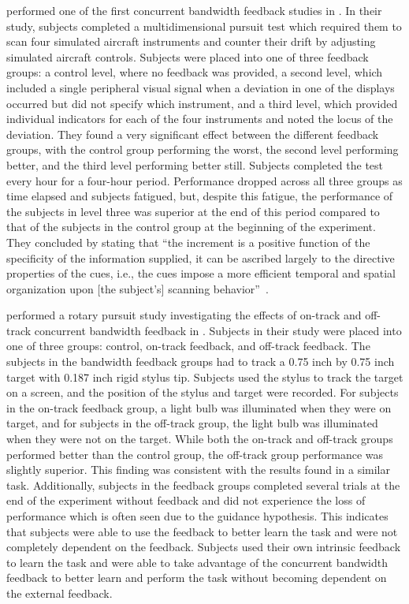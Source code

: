 \citeauthor{payne_effect_1955} performed one of the first concurrent bandwidth feedback studies in \citeyear{payne_effect_1955}.
In their study, subjects completed a multidimensional pursuit test which required them to scan four simulated aircraft instruments and counter their drift by adjusting simulated aircraft controls.
Subjects were placed into one of three feedback groups: a control level, where no feedback was provided, a second level, which included a single peripheral visual signal when a deviation in one of the displays occurred but did not specify which instrument, and a third level, which provided individual indicators for each of the four instruments and noted the locus of the deviation.
They found a very significant effect between the different feedback groups, with the control group performing the worst, the second level performing better, and the third level performing better still.
Subjects completed the test every hour for a four-hour period.
Performance dropped across all three groups as time elapsed and subjects fatigued, but, despite this fatigue, the performance of the subjects in level three was superior at the end of this period compared to that of the subjects in the control group at the beginning of the experiment.
They concluded by stating that ``the increment is a positive function of the specificity of the information supplied, it can be ascribed largely to the directive properties of the cues, i.e., the cues impose a more efficient temporal and spatial organization upon [the subject's] scanning behavior''~\citep{payne_effect_1955}.

\citeauthor{gordon_effect_1967} performed a rotary pursuit study investigating the effects of on-track and off-track concurrent bandwidth feedback in \citeyear{gordon_effect_1967}.
Subjects in their study were placed into one of three groups: control, on-track feedback, and off-track feedback.
The subjects in the bandwidth feedback groups had to track a 0.75 inch by 0.75 inch target with 0.187 inch rigid stylus tip.
Subjects used the stylus to track the target on a screen, and the position of the stylus and target were recorded.
For subjects in the on-track feedback group, a light bulb was illuminated when they were on target, and for subjects in the off-track group, the light bulb was illuminated when they were not on the target.
While both the on-track and off-track groups performed better than the control group, the off-track group performance was slightly superior.
This finding was consistent with the results \citeauthor{williams_-target_1962} found in a similar task.
Additionally, subjects in the feedback groups completed several trials at the end of the experiment without feedback and did not experience the loss of performance which is often seen due to the guidance hypothesis.
This indicates that subjects were able to use the feedback to better learn the task and were not completely dependent on the feedback.
Subjects used their own intrinsic feedback to learn the task and were able to take advantage of the concurrent bandwidth feedback to better learn and perform the task without becoming dependent on the external feedback.

